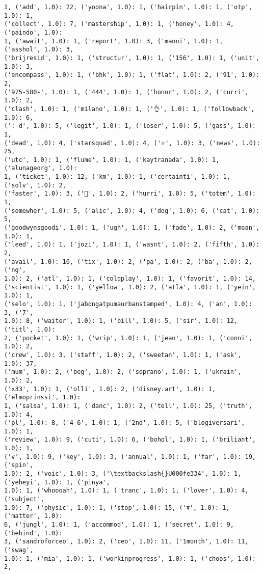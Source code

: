 \documentclass[11pt]{article}
\begin{document}
\begin{Verbatim}[commandchars=\\\{\}]
1, ('add', 1.0): 22, ('yoona', 1.0): 1, ('hairpin', 1.0): 1, ('otp', 1.0): 1,
('collect', 1.0): 7, ('mastership', 1.0): 1, ('honey', 1.0): 4, ('paindo', 1.0):
1, ('await', 1.0): 1, ('report', 1.0): 3, ('manni', 1.0): 1, ('asshol', 1.0): 3,
('brijresid', 1.0): 1, ('structur', 1.0): 1, ('156', 1.0): 1, ('unit', 1.0): 3,
('encompass', 1.0): 1, ('bhk', 1.0): 1, ('flat', 1.0): 2, ('91', 1.0): 2,
('975-580-', 1.0): 1, ('444', 1.0): 1, ('honor', 1.0): 2, ('curri', 1.0): 2,
('clash', 1.0): 1, ('milano', 1.0): 1, ('👌', 1.0): 1, ('followback', 1.0): 6,
(':-d', 1.0): 5, ('legit', 1.0): 1, ('loser', 1.0): 5, ('gass', 1.0): 1,
('dead', 1.0): 4, ('starsquad', 1.0): 4, ('⭐', 1.0): 3, ('news', 1.0): 25,
('utc', 1.0): 1, ('flume', 1.0): 1, ('kaytranada', 1.0): 1, ('alunageorg', 1.0):
1, ('ticket', 1.0): 12, ('km', 1.0): 1, ('certainti', 1.0): 1, ('solv', 1.0): 2,
('faster', 1.0): 3, ('👊', 1.0): 2, ('hurri', 1.0): 5, ('totem', 1.0): 1,
('somewher', 1.0): 5, ('alic', 1.0): 4, ('dog', 1.0): 6, ('cat', 1.0): 5,
('goodwynsgoodi', 1.0): 1, ('ugh', 1.0): 1, ('fade', 1.0): 2, ('moan', 1.0): 1,
('leed', 1.0): 1, ('jozi', 1.0): 1, ('wasnt', 1.0): 2, ('fifth', 1.0): 2,
('avail', 1.0): 10, ('tix', 1.0): 2, ('pa', 1.0): 2, ('ba', 1.0): 2, ('ng',
1.0): 2, ('atl', 1.0): 1, ('coldplay', 1.0): 1, ('favorit', 1.0): 14,
('scientist', 1.0): 1, ('yellow', 1.0): 2, ('atla', 1.0): 1, ('yein', 1.0): 1,
('selo', 1.0): 1, ('jabongatpumaurbanstamped', 1.0): 4, ('an', 1.0): 3, ('7',
1.0): 8, ('waiter', 1.0): 1, ('bill', 1.0): 5, ('sir', 1.0): 12, ('titl', 1.0):
2, ('pocket', 1.0): 1, ('wrip', 1.0): 1, ('jean', 1.0): 1, ('conni', 1.0): 2,
('crew', 1.0): 3, ('staff', 1.0): 2, ('sweetan', 1.0): 1, ('ask', 1.0): 37,
('mum', 1.0): 2, ('beg', 1.0): 2, ('soprano', 1.0): 1, ('ukrain', 1.0): 2,
('x33', 1.0): 1, ('olli', 1.0): 2, ('disney.art', 1.0): 1, ('elmoprinssi', 1.0):
1, ('salsa', 1.0): 1, ('danc', 1.0): 2, ('tell', 1.0): 25, ('truth', 1.0): 4,
('pl', 1.0): 8, ('4-6', 1.0): 1, ('2nd', 1.0): 5, ('blogiversari', 1.0): 1,
('review', 1.0): 9, ('cuti', 1.0): 6, ('bohol', 1.0): 1, ('briliant', 1.0): 1,
('v', 1.0): 9, ('key', 1.0): 3, ('annual', 1.0): 1, ('far', 1.0): 19, ('spin',
1.0): 2, ('voic', 1.0): 3, ('\textbackslash{}U000fe334', 1.0): 1, ('yeheyi', 1.0): 1, ('pinya',
1.0): 1, ('whoooah', 1.0): 1, ('tranc', 1.0): 1, ('lover', 1.0): 4, ('subject',
1.0): 7, ('physic', 1.0): 1, ('stop', 1.0): 15, ('ब', 1.0): 1, ('matter', 1.0):
6, ('jungl', 1.0): 1, ('accommod', 1.0): 1, ('secret', 1.0): 9, ('behind', 1.0):
3, ('sandroforceo', 1.0): 2, ('ceo', 1.0): 11, ('1month', 1.0): 11, ('swag',
1.0): 1, ('mia', 1.0): 1, ('workinprogress', 1.0): 1, ('choos', 1.0): 2,

\end{Verbatim}
\end{document}
